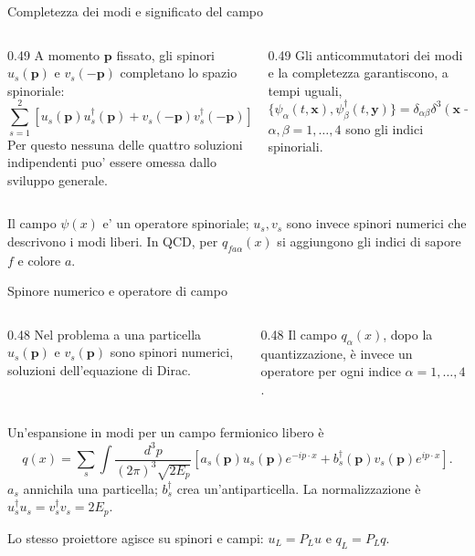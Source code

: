 \begin{frame}{Completezza dei modi e significato del campo}
\small
\begin{columns}[T,onlytextwidth]
\begin{column}{0.49\textwidth}
A momento $\mathbf p$ fissato, gli spinori
$u_s(\mathbf p)$ e $v_s(-\mathbf p)$ completano
lo spazio spinoriale:
\[
 \sum_{s=1}^{2}\left[
 u_s(\mathbf p)u_s^\dagger(\mathbf p)
 +v_s(-\mathbf p)v_s^\dagger(-\mathbf p)
 \right]=2E_{\mathbf p}\,\mathbf1_4.
\]
Per questo nessuna delle quattro soluzioni indipendenti
puo' essere omessa dallo sviluppo generale.
\end{column}
\begin{column}{0.49\textwidth}
Gli anticommutatori dei modi e la completezza
garantiscono, a tempi uguali,
\[
 \{\psi_\alpha(t,\mathbf x),
 \psi_\beta^\dagger(t,\mathbf y)\}
 =\delta_{\alpha\beta}\delta^3(\mathbf x-\mathbf y).
\]
$\alpha,\beta=1,\ldots,4$ sono gli indici spinoriali.
\end{column}
\end{columns}
\medskip
Il campo $\psi(x)$ e' un operatore spinoriale; $u_s,v_s$
sono invece spinori numerici che descrivono i modi liberi.
In QCD, per $q_{fa\alpha}(x)$ si aggiungono gli indici
di sapore $f$ e colore $a$.
\end{frame}

\begin{frame}{Spinore numerico e operatore di campo}
\small
\begin{columns}[T,onlytextwidth]
\begin{column}{0.48\textwidth}
Nel problema a una particella $u_s(\mathbf p)$ e $v_s(\mathbf p)$ sono spinori numerici, soluzioni dell'equazione di Dirac.
\end{column}
\begin{column}{0.48\textwidth}
Il campo $q_\alpha(x)$, dopo la quantizzazione, è invece un operatore per ogni indice $\alpha=1,\ldots,4$.
\end{column}
\end{columns}
\medskip
Un'espansione in modi per un campo fermionico libero è
\[
 q(x)=\sum_s\int\frac{d^3p}{(2\pi)^3\sqrt{2E_p}}
 \left[a_s(\mathbf p)u_s(\mathbf p)e^{-ip\cdot x}
 +b_s^\dagger(\mathbf p)v_s(\mathbf p)e^{ip\cdot x}\right].
\]
$a_s$ annichila una particella; $b_s^\dagger$ crea un'antiparticella. La normalizzazione è $u_s^\dagger u_s=v_s^\dagger v_s=2E_p$.

Lo stesso proiettore agisce su spinori e campi: $u_L=P_Lu$ e $q_L=P_Lq$.
\end{frame}

